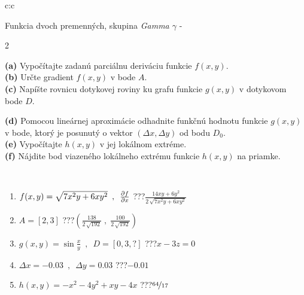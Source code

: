 \documentclass[10pt]{report}
\begin{document}
\begin{tabular}{c:c}
\begin{minipage}[c][104.5mm][t]{0.5\linewidth}
\begin{center}
\vspace{7mm}
{\huge \LARGE Funkcia dvoch premenných, skupina \textit{Gamma $\gamma$} -}\\[5mm]
\begin{minipage}{0.95\linewidth}
\begin{center}
{\small \begin{multicols}{2} \raggedright
\textbf{(a)} Vypočítajte zadanú parciálnu deriváciu funkcie \(f(x,y)\). \\[1mm]
\textbf{(b)} Určte gradient \(f(x,y)\) v bode \(A\). \\[1mm]
\textbf{(c)} Napíšte rovnicu dotykovej roviny ku grafu funkcie \(g(x,y)\) v dotykovom bode \(D\). \par \columnbreak
\textbf{(d)} Pomocou lineárnej aproximácie odhadnite funkčnú hodnotu funkcie \(g(x,y)\) v bode, ktorý je posunutý o vektor \((\Delta x, \Delta y)\) od bodu \(D_0\). \\[1mm]
\textbf{(e)} Vypočítajte \(h(x,y)\) v jej lokálnom extréme. \\[1mm]
\textbf{(f)} Nájdite bod viazeného lokálneho extrému funkcie \(h(x,y)\) na priamke. \\[1mm]
\end{multicols}
}
\end{center}
\end{minipage}
\\[4mm]
\begin{minipage}{0.79\linewidth}
\begin{center}
\begin{varwidth}{\linewidth}
\begin{enumerate}
\normalsizerr
\item $f(x,y) = \sqrt{7x^2y + 6xy^2}\enspace , \enspace \pdv{f}{x}$\quad \dotfill\; ???\;\dotfill \quad $\frac{14xy+6y^2}{2\,\sqrt{7x^2y+6xy^2}}$
\item $A = [2, 3]$\quad \dotfill\; ???\;\dotfill \quad $\left( \frac{138}{2\,\sqrt{192}} \;,\; \frac{100}{2\,\sqrt{192}} \right)$
\item $g(x,y) = \sin\frac{x}{y} \enspace , \enspace D = [0, 3, ?]$\quad \dotfill\; ???\;\dotfill \quad $x-3z=0$
\item $\Delta x = {-0.03} \enspace,\enspace \Delta y = {0.03}$\quad \dotfill\; ???\;\dotfill \quad $-0.01$
\item $h(x,y) = -x^2-4y^2+xy-4x$\quad \dotfill\; ???\;\dotfill \quad $\nicefrac{64}{17}$

\end{enumerate}
\end{varwidth}
\end{center}
\end{minipage}
\end{center}
\end{minipage}
\end{tabular}
\end{document}
